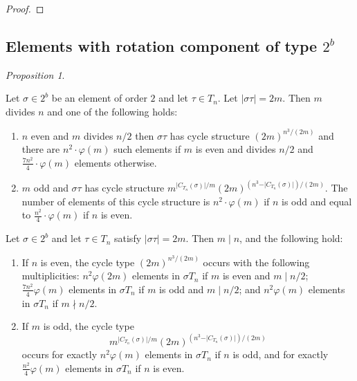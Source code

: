 \documentclass[12pt]{article}
\theoremstyle{definition}
\theoremstyle{remark}
\newtheorem{proposition}[theorem]{Proposition}
\begin{document}
\begin{proof}


\end{proof}
\subsection{Elements with rotation component of type $2^b$}

\begin{proposition}\label{prop:cycle-2b}
{\color{red}    Let $\sigma\in 2^b$ be an element of order $2$ and let $\tau \in T_n$. Let $\vert \sigma\tau\vert =2m.$
Then $m$ divides $n$ and one of the following holds:
\begin{enumerate}
\item[(a)] $n$ even and $m$ divides $n/2$ then
$\sigma\tau $ has cycle structure $(2m)^{n^3/(2m)}$
and there are $n^2\cdot \varphi(m)$ such elements if $m$ is even and  divides $n/2$ and $\frac{7n^2}{4}\cdot \varphi(m)$ elements otherwise.
\item[(b)]   $m$ odd
and $\sigma \tau$ has cycle structure  $m^{\vert C_{T_n}(\sigma)\vert /m}(2m)^{(n^3-\vert C_{T_n}(\sigma)\vert )/(2m)}$.
The number of elements
of this cycle structure is
$n^2 \cdot \varphi(m)$ if $n$ is odd and equal to $\frac{n^2}{4} \cdot \varphi(m)$
if $n$ is even.
\end{enumerate}
}
{\color{blue}Let $\sigma\in 2^b$ and let $\tau\in T_n$ satisfy $\vert\sigma\tau\vert=2m$.
Then $m\mid n$, and the following hold:
\begin{enumerate}
\item[(a)] If $n$ is even, the cycle type
$(2m)^{n^3/(2m)}$
occurs with the following multiplicities:
$n^2\varphi(2m)$ elements in $\sigma T_n$ if $m$ is even and $m\mid n/2$;
$\frac{7n^2}{4}\varphi(m)$ elements in $\sigma T_n$ if $m$ is odd and $m\mid n/2$;
and $n^2\varphi(m)$ elements in $\sigma T_n$ if $m\nmid n/2$.
\item[(b)] If $m$ is odd, the cycle type
\[
m^{\vert C_{T_n}(\sigma)\vert/m}
(2m)^{(n^3-\vert C_{T_n}(\sigma)\vert)/(2m)}
\]
occurs for exactly $n^2\varphi(m)$ elements in $\sigma T_n$ if $n$ is odd, and for exactly
$\frac{n^2}{4}\varphi(m)$ elements in $\sigma T_n$ if $n$ is even.
\end{enumerate}}
\end{proposition}
\end{document}
